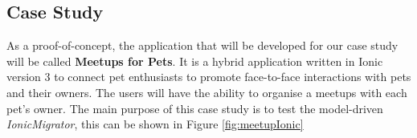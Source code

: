 \documentclass[conference]{IEEEtran}
\begin{document}
\subsection{Case Study}
As a proof-of-concept, the application that will be developed for our case study will be called \textbf{Meetups for Pets}. It is a hybrid application written
in Ionic version 3 to connect pet enthusiasts to promote face-to-face interactions with pets and their owners. The users will have the ability to organise a
meetups with each pet’s owner. The main purpose of this case study is to test the model-driven \textit{IonicMigrator}, this can be shown in Figure \ref{fig:meetupIonic}
\begin{figure}[!htb]%
    \centering

\end{figure}
\end{document}
